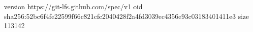 version https://git-lfs.github.com/spec/v1
oid sha256:52bc6f4fe22599f66c821cfc2040428f2a4fd3039ec4356e93c03183401411e3
size 113142
